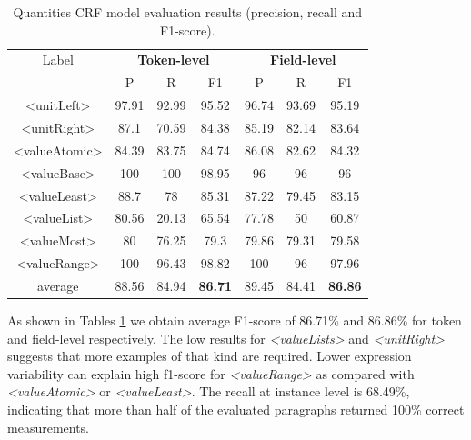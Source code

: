\documentclass[sigconf]{acmart}
\begin{document}
\begin{table}[ht]
   \caption{Quantities CRF model evaluation results (precision, recall and F1-score).}
   \label{tab:quantities-evaluation}
   \begin{tabular}{c|ccc|ccc}
       \toprule
       Label & \multicolumn{3}{c}{\textbf{Token-level}} & \multicolumn{3}{c}{\textbf{Field-level}}\\
        & P & R & F1 & P & R & F1 \\
       \midrule
       <unitLeft>    & 97.91 & 92.99 & 95.52 & 96.74 & 93.69 & 95.19\\
       <unitRight>   & 87.1  & 70.59 & 84.38 & 85.19 & 82.14 & 83.64\\
       <valueAtomic> & 84.39 & 83.75 & 84.74 & 86.08 & 82.62 & 84.32\\
       <valueBase>   & 100   & 100   & 98.95 & 96    & 96    & 96   \\
       <valueLeast>  & 88.7  & 78    & 85.31 & 87.22 & 79.45 & 83.15\\
       <valueList>   & 80.56 & 20.13 & 65.54 & 77.78 & 50    & 60.87\\
       <valueMost>   & 80    & 76.25 & 79.3  & 79.86 & 79.31 & 79.58\\
       <valueRange>  & 100   & 96.43 & 98.82 & 100   & 96    & 97.96\\
       \midrule
       average       & 88.56  & 84.94 & \textbf{86.71} & 89.45 & 84.41 & \textbf{86.86}\\
       \bottomrule
   \end{tabular}
\end{table}

As shown in Tables \ref{tab:quantities-evaluation} we obtain average F1-score of 86.71\% and 86.86\% for token and field-level respectively. The low results for \textit{<valueLists>} and \textit{<unitRight>} suggests that more examples of that kind are required. Lower expression variability can explain high f1-score for \textit{<valueRange>} as compared with \textit{<valueAtomic>} or \textit{<valueLeast>}. The recall at instance level is 68.49\%, indicating that more than half of the evaluated paragraphs returned 100\% correct measurements. 
\end{document}

